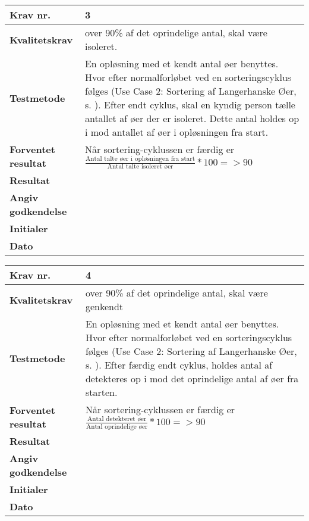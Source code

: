 \newpage
			
	\begin{center}
		\begin{longtable}{ | m{4cm}| m{8.5cm}|} 
			\hline
			\textbf{Krav nr.} & 3 \\ 
			\hline
			\textbf{Kvalitetskrav} & over 90\% af det oprindelige antal, skal være isoleret. \\
			\hline
			\textbf{Testmetode} &  En opløsning med et kendt antal øer benyttes. Hvor efter normalforløbet ved en sorteringscyklus følges (Use Case 2: Sortering af Langerhanske Øer, s. \pageref{uc:2}). Efter endt cyklus, skal en kyndig person tælle antallet af øer der er isoleret. Dette antal holdes op i mod antallet af øer i opløsningen fra start.  \\
			\hline
			\textbf{Forventet resultat}  & Når sortering-cyklussen er færdig er
 $\frac{\text{Antal talte øer i opløsningen fra start}}{\text{Antal talte isoleret øer}}*100= >90$
 \\
			\hline
			\textbf{Resultat}  &    \\
			\hline
			\textbf{Angiv godkendelse} &     \\
			\hline
			\textbf{Initialer} &     \\
			\hline
			\textbf{Dato} &    \\
			\hline
		\end{longtable}
	\end{center}		
			
	\begin{center}
		\begin{longtable}{ | m{4cm}| m{8.5cm}|} 
			\hline
			\textbf{Krav nr.} & 4 \\ 
			\hline
			\textbf{Kvalitetskrav} & over 90\% af det oprindelige antal, skal være genkendt \\
			\hline
			\textbf{Testmetode} &  En opløsning med et kendt antal øer benyttes. Hvor efter normalforløbet ved en sorteringscyklus følges (Use Case 2: Sortering af Langerhanske Øer, s. \pageref{uc:2}). Efter færdig endt cyklus, holdes antal af detekteres op i mod det oprindelige antal af øer fra starten.  \\
			\hline
			\textbf{Forventet resultat}  & Når sortering-cyklussen er færdig er
 $\frac{\text{Antal detekteret øer}}{\text{Antal oprindelige øer}} * 100 = >90$ \\
			\hline
			\textbf{Resultat}  &    \\
			\hline
			\textbf{Angiv godkendelse} &     \\
			\hline
			\textbf{Initialer} &     \\
			\hline
			\textbf{Dato} &    \\
			\hline
		\end{longtable}
	\end{center}				
\newpage	
			
